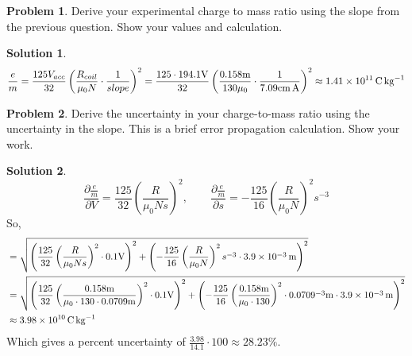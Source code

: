 \documentclass[10pt]{article}
\theoremstyle{definition}
\newtheorem{problem}{Problem}
\newtheorem{soln}{Solution}
\begin{document}
\begin{problem}
Derive your experimental charge to mass ratio using the slope from the previous question. Show your values and calculation.
\end{problem}
\begin{soln}
  $$\frac{e}{m}=\frac{125V_{acc}}{32}\left(\frac{R_{coil}}{\mu_0N}\cdot\frac{1}{slope}\right)^2=\frac{125\cdot194.1\unit{\volt}}{32}\left(\frac{0.158\unit{\meter}}{130\mu_0}\cdot\frac{1}{7.09\unit{\centi\meter\ampere}}\right)^2\approx\qty{1.41d11}{\coulomb\per\kilo\gram}$$
\end{soln}
\newpage

\begin{problem}
Derive the uncertainty in your charge-to-mass ratio using the uncertainty in the slope. This is a brief error propagation calculation. Show your work.
\end{problem}
\begin{soln}
  $$\frac{\partial \frac{e}{m}}{\partial V}=\frac{125}{32}\left(\frac{R}{\mu_0Ns}\right)^2,\qquad \frac{\partial \frac{e}{m}}{\partial s}=-\frac{125}{16}\left(\frac{R}{\mu_0N}\right)^2s^{-3}$$
  So,
  \begin{align*}
     & =\sqrt{\left(\frac{125}{32}\left(\frac{R}{\mu_0Ns}\right)^2\cdot 0.1\unit{\volt}\right)^2+\left(-\frac{125}{16}\left(\frac{R}{\mu_0N}\right)^2s^{-3}\cdot\qty{3.9d-3}{\meter}\right)^2}                                                                                               \\
     & =\sqrt{\left(\frac{125}{32}\left(\frac{0.158\unit{\meter}}{\mu_0\cdot130\cdot0.0709\unit{\meter}}\right)^2\cdot 0.1\unit{\volt}\right)^2+\left(-\frac{125}{16}\left(\frac{0.158\unit{\meter}}{\mu_0\cdot130}\right)^2\cdot0.0709^{-3}\unit{\meter}\cdot\qty{3.9d-3}{\meter}\right)^2} \\
     & \approx\qty{3.98d10}{\coulomb\per\kilo\gram}
  \end{align*}
  Which gives a percent uncertainty of $\displaystyle\frac{3.98}{14.1}\cdot100\approx28.23\%$.
\end{soln}
\end{document}
